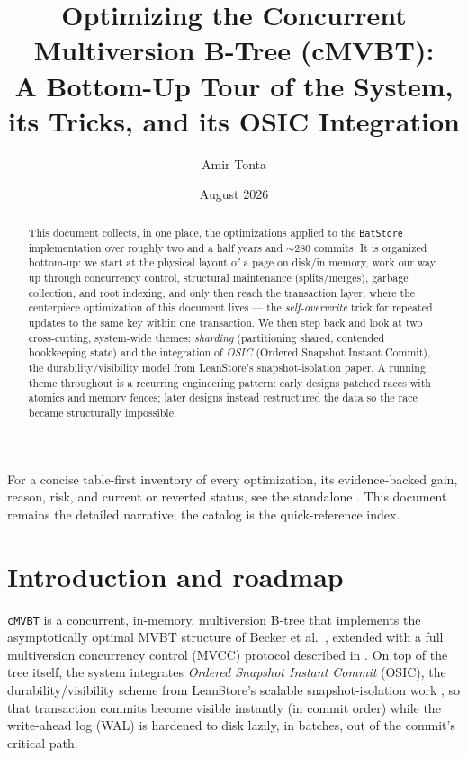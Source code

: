 \documentclass[11pt]{article}
\title{Optimizing the Concurrent Multiversion B-Tree (cMVBT):\\
       A Bottom-Up Tour of the System, its Tricks, and its OSIC Integration}
\author{Amir Tonta}
\date{August 2026}
\begin{document}
\maketitle

\begin{abstract}
This document collects, in one place, the optimizations applied to the \texttt{BatStore}
implementation over roughly two and a half years and $\sim$280 commits. It is organized
bottom-up: we start at the physical layout of a page on disk/in memory, work our way up
through concurrency control, structural maintenance (splits/merges), garbage collection,
and root indexing, and only then reach the transaction layer, where the centerpiece
optimization of this document lives --- the \emph{self-overwrite} trick for repeated
updates to the same key within one transaction. We then step back and look at two
cross-cutting, system-wide themes: \emph{sharding} (partitioning shared, contended
bookkeeping state) and the integration of \emph{OSIC} (Ordered Snapshot Instant Commit),
the durability/visibility model from LeanStore's snapshot-isolation paper. A running
theme throughout is a recurring engineering pattern: early designs patched races with
atomics and memory fences; later designs instead restructured the data so the race
became structurally impossible.
\end{abstract}

For a concise table-first inventory of every optimization, its evidence-backed gain,
reason, risk, and current or reverted status, see the standalone
. This document remains the detailed narrative;
the catalog is the quick-reference index.

\tableofcontents

\section{Introduction and roadmap}

\texttt{cMVBT} is a concurrent, in-memory, multiversion B-tree that implements the
asymptotically optimal MVBT structure of Becker et al.\ \cite{becker1996asymptotically},
extended with a full multiversion concurrency control (MVCC) protocol described in
\cite{tonta2026multiversion}. On top of the tree itself, the system integrates
\emph{Ordered Snapshot Instant Commit} (OSIC), the durability/visibility scheme from
LeanStore's scalable snapshot-isolation work \cite{alhomssi2023scalable}, so that
transaction commits become visible instantly (in commit order) while the write-ahead log
(WAL) is hardened to disk lazily, in batches, out of the commit's critical path.
\end{document}
